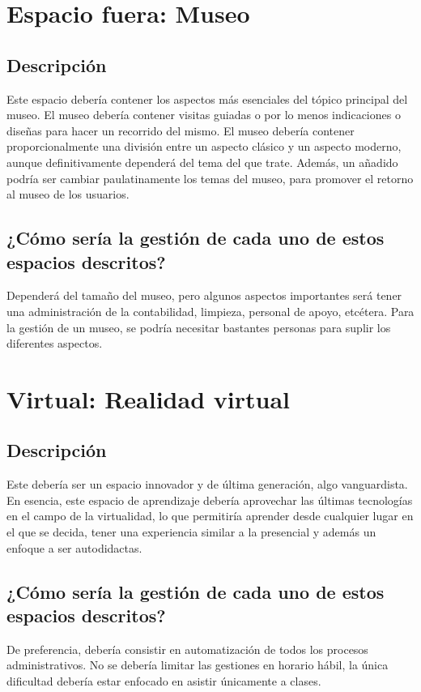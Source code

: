 \section{Espacio fuera: Museo}
\subsection{Descripción}

Este espacio debería contener los aspectos más esenciales del tópico principal del museo. El museo debería contener visitas guiadas o por lo menos indicaciones o diseñas para hacer un recorrido del mismo. El museo debería contener proporcionalmente una división entre un aspecto clásico y un aspecto moderno, aunque definitivamente dependerá del tema del que trate. Además, un añadido podría ser cambiar paulatinamente los temas del museo, para promover el retorno al museo de los usuarios.


\subsection{¿Cómo sería la gestión de cada uno de estos espacios descritos?}

Dependerá del tamaño del museo, pero algunos aspectos importantes será tener una administración de la contabilidad, limpieza, personal de apoyo, etcétera. Para la gestión de un museo, se podría necesitar bastantes personas para suplir los diferentes aspectos. 

\section{Virtual: Realidad virtual}
\subsection{Descripción}
Este debería ser un espacio innovador y de última generación, algo vanguardista. En esencia, este espacio de aprendizaje debería aprovechar las últimas tecnologías en el campo de la virtualidad, lo que permitiría aprender desde cualquier lugar en el que se decida, tener una experiencia similar a la presencial y además un enfoque a ser autodidactas. 

\subsection{¿Cómo sería la gestión de cada uno de estos espacios descritos?}

De preferencia, debería consistir en automatización de todos los procesos administrativos. No se debería limitar las gestiones en horario hábil, la única dificultad debería estar enfocado en asistir únicamente a clases. 
%
%

